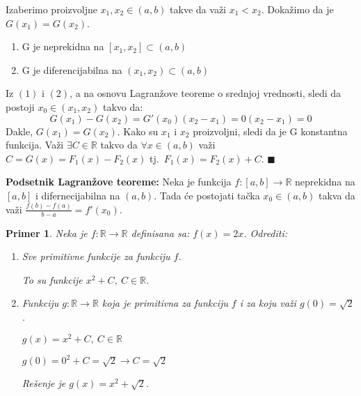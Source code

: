 \documentclass{article}
\newtheorem{prim}{Primer}[section]
\begin{document}
Izaberimo proizvoljne $x_1, x_2 \in (a, b)$ takve da važi
$x_1 < x_2$. Dokažimo da je $G(x_1) = G(x_2)$.
\begin{enumerate}[label=(\arabic*)]
    \item G je neprekidna na $[x_1, x_2] \subset (a, b)$
    \item G je diferencijabilna na $(x_1, x_2) \subset (a, b)$
\end{enumerate}
Iz $(1)$ i $(2)$, a na osnovu Lagranžove teoreme o srednjoj vrednosti,
sledi da postoji $x_0 \in (x_1, x_2)$ takvo da:
$$G(x_1) - G(x_2) = G'(x_0)(x_2-x_1) = 0  (x_2-x_1) = 0$$
Dakle, $G(x_1) = G(x_2)$. Kako su $x_1$ i $x_2$
proizvoljni, sledi da je G konstantna funkcija. Važi
$\exists C\in\mathbb{R}$ takvo da  $\forall x \in (a, b)$ važi
$C=G(x) =F_1(x) - F_2(x)$ tj.\ $F_1(x) = F_2(x) + C$.
\null\hfill $\blacksquare$ \par

\begin{teoremabox}
    \textbf{Podsetnik Lagranžove teoreme:} Neka je funkcija
    $f : [a,b]\longrightarrow\mathbb{R}$ neprekidna na $[a,b]$
    i difernecijabilna na $(a,b)$. Tada će
    postojati tačka $x_0\in(a,b)$ takva da važi
    $\frac{f(b)-f(a)}{b-a}=f'(x_0)$.
\end{teoremabox}


\begin{primbox}
    \begin{prim}
        Neka je $f: \mathbb{R} \longrightarrow \mathbb{R}$
        definisana sa: $f(x) = 2x$. Odrediti:
        \begin{enumerate}[label=\alph*)]
            \item Sve primitivne funkcije za funkciju $f$.\par
                  To su funkcije $x^2 + C,\  C \in \mathbb{R}$.
            \item Funkciju $g: \mathbb{R} \longrightarrow \mathbb{R}$
                  koja je primitivna za funkciju $f$ i za koju važi
                  $g(0) = \sqrt{2}$.\par
                  $g(x) = x^2 + C,\ C \in \mathbb{R}$\par
                  $g(0) = 0^2 + C = \sqrt{2} \longrightarrow C = \sqrt{2}$\par
                  Rešenje je $g(x) = x^2 + \sqrt{2}$.
        \end{enumerate}
    \end{prim}
\end{primbox}
\end{document}
